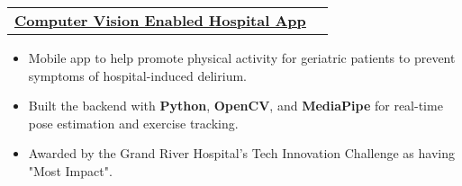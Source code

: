 \documentclass[letterpaper]{article}
\makeatletter
\newcommand{\resumeItem}[1]{
  \item\small{
    {#1 \vspace{-2pt}}
  }
}
\newcommand{\resumeProjectHeading}[2]{
    \item
    \begin{tabular*}{0.97\textwidth}{l@{\extracolsep{\fill}}r}
      \small#1 & #2 \\
    \end{tabular*}\vspace{-7pt}
}
\newcommand{\resumeItemListStart}{\begin{itemize}}
\newcommand{\resumeItemListEnd}{\end{itemize}\vspace{-5pt}}
\makeatother
\begin{document}

\resumeProjectHeading
    {\textbf{\underline{\href{https://www.youtube.com/playlist?list=PL2zKq55_kXLenkTwrxIJvVcfiL-i74W9J}{Computer Vision Enabled Hospital App}}} }{}
    \resumeItemListStart
      \resumeItem{Mobile app to help promote physical activity for geriatric patients to prevent symptoms of hospital-induced delirium.}
      \resumeItem{Built the backend with \textbf{Python}, \textbf{OpenCV}, and \textbf{MediaPipe} for real-time pose estimation and exercise tracking.}
      \resumeItem{Awarded by the Grand River Hospital's Tech Innovation Challenge as having "Most Impact".}
    \resumeItemListEnd



\end{document}
